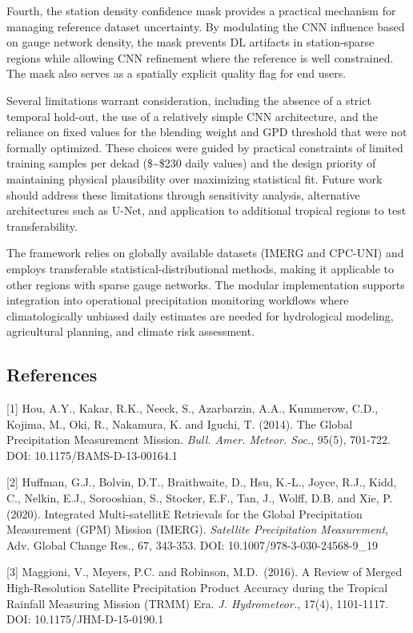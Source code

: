 \documentclass[
]{article}
\begin{document}
Fourth, the station density confidence mask provides a practical
mechanism for managing reference dataset uncertainty. By modulating the
CNN influence based on gauge network density, the mask prevents DL
artifacts in station-sparse regions while allowing CNN refinement where
the reference is well constrained. The mask also serves as a spatially
explicit quality flag for end users.

Several limitations warrant consideration, including the absence of a
strict temporal hold-out, the use of a relatively simple CNN
architecture, and the reliance on fixed values for the blending weight
and GPD threshold that were not formally optimized. These choices were
guided by practical constraints of limited training samples per dekad
(\$\sim\$230 daily values) and the design priority of maintaining
physical plausibility over maximizing statistical fit. Future work
should address these limitations through sensitivity analysis,
alternative architectures such as U-Net, and application to additional
tropical regions to test transferability.

The framework relies on globally available datasets (IMERG and CPC-UNI)
and employs transferable statistical-distributional methods, making it
applicable to other regions with sparse gauge networks. The modular
implementation supports integration into operational precipitation
monitoring workflows where climatologically unbiased daily estimates are
needed for hydrological modeling, agricultural planning, and climate
risk assessment.

\subsection{References}\label{references}

{[}1{]} Hou, A.Y., Kakar, R.K., Neeck, S., Azarbarzin, A.A., Kummerow,
C.D., Kojima, M., Oki, R., Nakamura, K. and Iguchi, T. (2014). The
Global Precipitation Measurement Mission. \emph{Bull. Amer. Meteor.
Soc.}, 95(5), 701-722. DOI: 10.1175/BAMS-D-13-00164.1

{[}2{]} Huffman, G.J., Bolvin, D.T., Braithwaite, D., Hsu, K.-L., Joyce,
R.J., Kidd, C., Nelkin, E.J., Sorooshian, S., Stocker, E.F., Tan, J.,
Wolff, D.B. and Xie, P. (2020). Integrated Multi-satellitE Retrievals
for the Global Precipitation Measurement (GPM) Mission (IMERG).
\emph{Satellite Precipitation Measurement}, Adv. Global Change Res., 67,
343-353. DOI: 10.1007/978-3-030-24568-9\_19

{[}3{]} Maggioni, V., Meyers, P.C. and Robinson, M.D.~(2016). A Review
of Merged High-Resolution Satellite Precipitation Product Accuracy
during the Tropical Rainfall Measuring Mission (TRMM) Era. \emph{J.
Hydrometeor.}, 17(4), 1101-1117. DOI: 10.1175/JHM-D-15-0190.1
\end{document}
